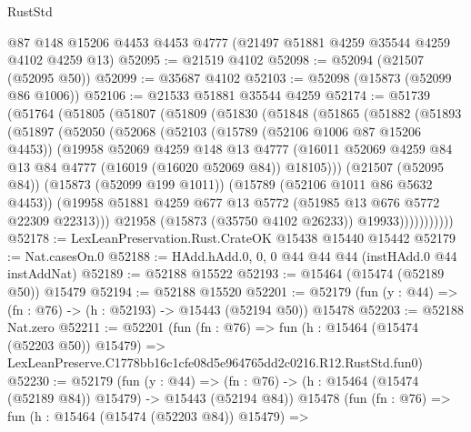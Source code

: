\begin{lexlean}{RustStd}
\begin{coremodule}
    @87
    @148
    @15206
    @4453
    @4453
    @4777
    (@21497 @51881 @4259 @35544 @4259 @4102 @4259 @13)
@52095 := @21519 @4102
@52098 := @52094 (@21507 (@52095 @50))
@52099 := @35687 @4102
@52103 := @52098 (@15873 (@52099 @86 @1006))
@52106 := @21533 @51881 @35544 @4259
@52174 := @51739
    (@51764
      (@51805
        (@51807
          (@51809
            (@51830
              (@51848
                (@51865
                  (@51882
                    (@51893
                      (@51897
                        (@52050
                          (@52068
                            (@52103
                              (@15789 (@52106 @1006 @87 @15206 @4453))
                              (@19958
                                @52069
                                @4259
                                @148
                                @13
                                @4777
                                (@16011
                                  @52069
                                  @4259
                                  @84
                                  @13
                                  @84
                                  @4777
                                  (@16019 (@16020 @52069 @84))
                                  @18105)))
                            (@21507 (@52095 @84))
                            (@15873 (@52099 @199 @1011))
                            (@15789 (@52106 @1011 @86 @5632 @4453))
                            (@19958
                              @51881
                              @4259
                              @677
                              @13
                              @5772
                              (@51985 @13 @676 @5772 @22309 @22313)))
                          @21958
                          (@15873 (@35750 @4102 @26233))
                          @19933)))))))))))
@52178 := LexLeanPreservation.Rust.CrateOK @15438 @15440 @15442
@52179 := Nat.casesOn.{0}
@52188 := HAdd.hAdd.{0, 0, 0} @44 @44 @44 (instHAdd.{0} @44 instAddNat)
@52189 := @52188 @15522
@52193 := @15464 (@15474 (@52189 @50)) @15479
@52194 := @52188 @15520
@52201 := @52179 (fun (y : @44) => (fn : @76) -> (h : @52193) -> @15443 (@52194 @50)) @15478
@52203 := @52188 Nat.zero
@52211 := @52201
    (fun (fn : @76) =>
    fun (h : @15464 (@15474 (@52203 @50)) @15479) =>
    LexLeanPreserve.C1778bb16c1cfe08d5e964765dd2c0216.R12.RustStd.fun0)
@52230 := @52179
    (fun (y : @44) =>
    (fn : @76) -> (h : @15464 (@15474 (@52189 @84)) @15479) -> @15443 (@52194 @84))
    @15478
    (fun (fn : @76) =>
    fun (h : @15464 (@15474 (@52203 @84)) @15479) =>

\end{coremodule}
\end{lexlean}
